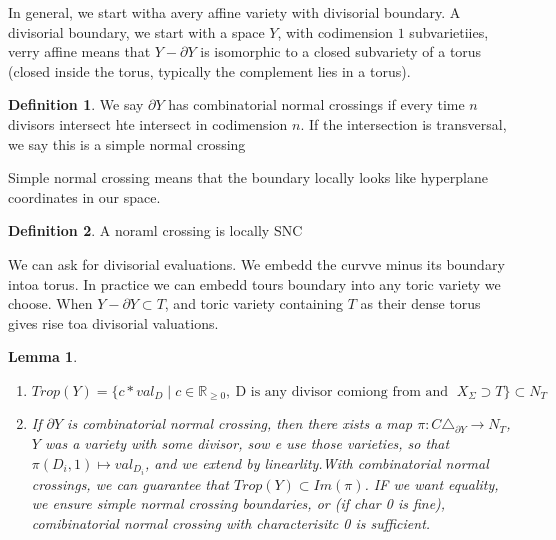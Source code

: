 \documentclass[11pt]{article}
\newtheorem{protolemma}[prototheorem]{Lemma}
\newenvironment{lemma}
   {\begin{protolemma}}
   {\end{protolemma}}
\theoremstyle{definition}
\newtheorem{protodefinition}{Definition}[section]
\newenvironment{define}
   {\begin{protodefinition}}
   {\end{protodefinition}}
\def\RR{{\mathbb R}}
\begin{document}
In general, we start witha  avery affine variety with divisorial boundary. A divisorial boundary, we start with a space $Y$, with codimension $1$ subvarietiies, verry affine means that $Y- \partial Y$ is isomorphic to a closed subvariety of a torus (closed inside the torus, typically the complement lies in a torus).

\begin{define}
    We say $\partial Y$ has combinatorial normal crossings if every time $n$ divisors intersect hte intersect in codimension $n$. If the intersection is transversal, we say this is a simple normal crossing
\end{define}

Simple normal crossing means that the boundary locally looks like hyperplane coordinates in our space.

\begin{define}
A noraml crossing is locally SNC
\end{define}






We can ask for divisorial evaluations. We embedd the curvve minus its boundary intoa  torus. In practice we can embedd tours boundary into any toric variety we choose. When $Y- \partial Y \subset T$, and toric variety containing $T$ as their dense torus gives rise toa  divisorial valuations.

\begin{lemma}
    \begin{enumerate}
        \item $Trop(Y) = \{c *val_D \; |\; c \in \RR_{\geq 0}, \ \text{D is any divisor comiong from and }\; X_\Sigma \supset T\} \subset N_T$
        \item If $\partial Y$ is combinatorial normal crossing, then there xists a map $\pi: C \triangle_{\partial Y} \rightarrow N_T$, $Y$ was a variety with some divisor, sow e use those varieties, so that $\pi(D_i,1) \mapsto val_{D_i}$, and we extend by linearlity.With combinatorial normal crossings, we can guarantee that $Trop(Y) \subset Im(\pi)$. IF we want equality, we ensure simple normal crossing boundaries, or (if char 0 is fine), comibinatorial normal crossing with characterisitc 0 is sufficient.
    \end{enumerate}
\end{lemma}



\end{document}
